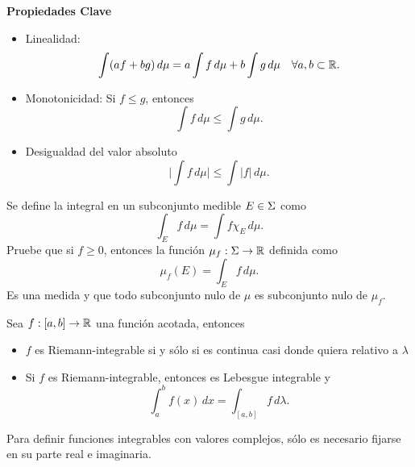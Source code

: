 \documentclass[main.tex]{subfiles}
\begin{document}
\noindent\textbf{Propiedades Clave}
\begin{itemize}
    \item Linealidad:
      \[
      \int (af + bg) \, d\mu = a\int f \, d\mu + b\int g \, d\mu\quad\forall{a,b}\subset\mathbb R .
      \]
    \item Monotonicidad: Si $f \leq g$, entonces
      \[
      \int f \, d\mu \leq \int g \, d\mu.
      \]
    \item Desigualdad del valor absoluto
      \[
      \Big|\int f \, d\mu\Big| \leq \int |f| \, d\mu.
      \]
\end{itemize}

\exe Se define la integral en un subconjunto medible $E\in\Sigma$ como
\[
\int_E f \, d\mu = \int f\chi_E\,d\mu.
\]
Pruebe que si $f\geq 0$, entonces la función $\mu_f:\Sigma\to\mathbb R $ definida como
\[
\mu_f(E)=\int_E f \, d\mu.
\]
Es una medida y que todo subconjunto nulo de $\mu$ es subconjunto nulo de $\mu_f$.
\begin{teorema}[de Lebesgue]
Sea $f:[a,b]\to\mathbb R $ una función acotada, entonces
\begin{itemize}
  \item $f$ es Riemann-integrable si y sólo si es continua casi donde quiera relativo a $\lambda$
  \item  Si $f$ es Riemann-integrable, entonces es Lebesgue integrable y
\[
\int_a^b f(x) \, dx=\int_{[a,b]} f \, d\lambda.
\]
  \end{itemize}
\end{teorema}
\obs Para definir funciones integrables con valores complejos, sólo es necesario fijarse en su parte real e imaginaria.
\end{document}
